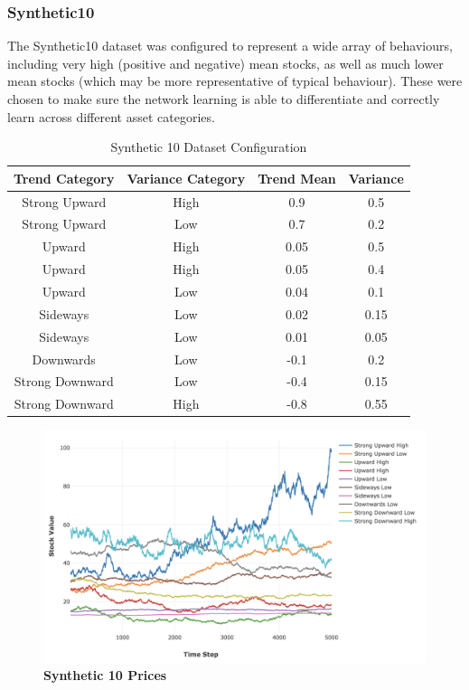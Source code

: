 \documentclass[a4paper,11pt,oneside]{article}
\theoremstyle{plain}
\theoremstyle{definition}
\begin{document}
\subsubsection{Synthetic10}\label{dataset_synthetic10}

The Synthetic10 dataset was configured to represent a wide array of behaviours, including very high (positive and negative) mean stocks, as well as much lower mean stocks (which may be more representative of typical behaviour). These were chosen to make sure the network learning is able to differentiate and correctly learn across different asset categories.

\begin{table}[H]
	\centering
	\begin{tabular}{|c|c|c|c|}
		\hline
		\textbf{Trend Category} &\textbf{Variance Category} & \textbf{Trend Mean} & \textbf{Variance}\\\hline	
		{Strong Upward} 		& {High} & {0.9} & {0.5} \\\hline
		{Strong Upward} 		& {Low} & {0.7} & {0.2} \\\hline
		{Upward} 					& {High} & {0.05} & {0.5} \\\hline
		{Upward} 					& {High} & {0.05} & {0.4} \\\hline
		{Upward} 					& {Low} & {0.04} & {0.1} \\\hline
		{Sideways} 					& {Low} & {0.02} & {0.15} \\\hline
		{Sideways}					& {Low} & {0.01} & {0.05} \\\hline
		{Downwards}				& {Low} & {-0.1} & {0.2} \\\hline
		{Strong Downward} 	& {Low} & {-0.4} & {0.15} \\\hline
		{Strong Downward}	& {High} & {-0.8} & {0.55} \\\hline
	\end{tabular}
	\newline\newline
	\caption{Synthetic 10 Dataset Configuration}\label{tab_synth10}
\end{table}

\begin{figure}[H]
	\centering
	\includegraphics[scale=0.35]{images/results/prices/synthetic10_prices.png} 
	\caption[Synthetic 10 Prices]{\textbf{Synthetic 10 Prices}}
	\label{figure-synthetic10_prices}
\end{figure}
\end{document}
